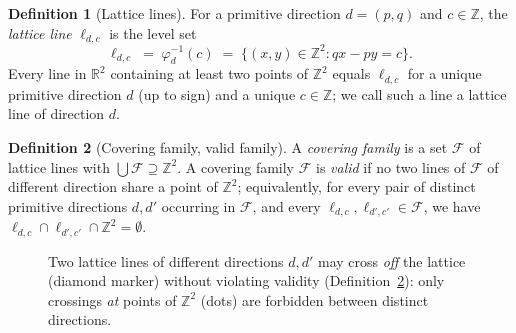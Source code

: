 \documentclass[a4paper,11pt,oneside,reqno]{amsart}
\theoremstyle{definition}
\newtheorem{definition}{Definition}
\theoremstyle{remark}
\theoremstyle{plain}
\newcommand{\Z}{\mathbb{Z}}
\newcommand{\R}{\mathbb{R}}
\begin{document}
\begin{definition}[Lattice lines]
  \label{def:lline}
  For a primitive direction \(d=(p,q)\) and \(c\in\Z\), the \emph{lattice line} \(\ell_{d,c}\) is the
  level set
  \begin{equation}
    \label{eq:lline-def}
    \ell_{d,c} \;=\; \varphi_d^{-1}(c) \;=\; \{(x,y)\in\Z^2 : qx-py=c\}.
  \end{equation}
  Every line in \(\R^2\) containing at least two points of \(\Z^2\) equals \(\ell_{d,c}\) for a unique
  primitive direction \(d\) (up to sign) and a unique \(c\in\Z\); we call such a line a lattice line of
  direction \(d\).
\end{definition}

\begin{definition}[Covering family, valid family]
  \label{def:family}
  A \emph{covering family} is a set \(\mathcal F\) of lattice lines with \(\bigcup\mathcal F\supseteq\Z^2\). A
  covering family \(\mathcal F\) is \emph{valid} if no two lines of \(\mathcal F\) of different
  direction share a point of \(\Z^2\); equivalently, for every pair of distinct primitive directions
  \(d,d'\) occurring in \(\mathcal F\), and every \(\ell_{d,c},\ell_{d',c'}\in\mathcal F\), we have
  \(\ell_{d,c}\cap\ell_{d',c'}\cap\Z^2=\emptyset\).
\end{definition}

\begin{figure}[h]
  \centering
  \caption{Two lattice lines of different directions \(d,d'\) may cross \emph{off} the lattice
  (diamond marker) without violating validity (Definition~\ref{def:family}): only crossings
  \emph{at} points of \(\Z^2\) (dots) are forbidden between distinct directions.}
  \label{fig:offlattice-crossing}
\end{figure}
\end{document}

